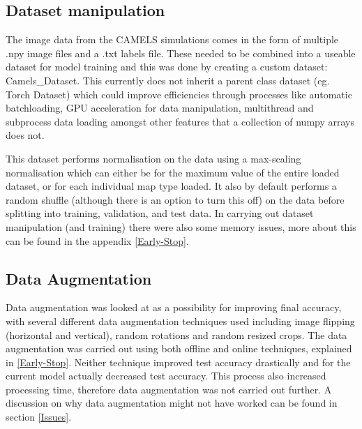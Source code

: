 \documentclass[11pt]{scrartcl}
\begin{document}
\subsection{Dataset manipulation}

The image data from the CAMELS simulations comes in the form of multiple .npy image files and a .txt labels file. These needed to be combined into a useable dataset for model training and this was done by creating a custom dataset: Camels\_Dataset. This currently does not inherit a parent class dataset (eg. Torch Dataset) which could improve efficiencies through processes like automatic batchloading, GPU acceleration for data manipulation, multithread and subprocess data loading amongst other features that a collection of numpy arrays does not.

This dataset performs normalisation on the data using a max-scaling normalisation which can either be for the maximum value of the entire loaded dataset, or for each individual map type loaded. It also by default performs a random shuffle (although there is an option to turn this off) on the data before splitting into training, validation, and test data. In carrying out dataset manipulation (and training) there were also some memory issues, more about this can be found in the appendix \ref{Early-Stop}.

\subsection{Data Augmentation}
Data augmentation was looked at as a possibility for improving final accuracy, with several different data augmentation techniques used including image flipping (horizontal and vertical), random rotations and random resized crops. The data augmentation was carried out using both offline and online techniques, explained in \ref{Early-Stop}. Neither technique improved test accuracy drastically and for the current model actually decreased test accuracy. This process also increased processing time, therefore data augmentation was not carried out further. A discussion on why data augmentation might not have worked can be found in section \ref{Issues}.
\end{document}
